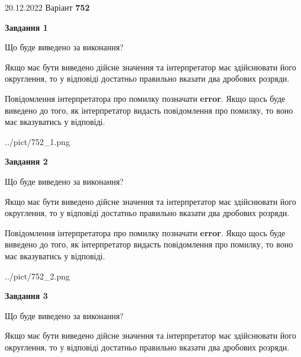 \documentclass[12pt, ukrainian]{article}
\begin{document}
{20.12.2022 Варіант \No \textbf { 752 }\par}
{
\begin {Large}

{\begin {center}\textbf{Завдання 1}\end {center}}\par
Що буде виведено за виконання? \par

Якщо має бути виведено дійсне значення та інтерпретатор має здійснювати його округлення, 
то у відповіді достатньо правильно вказати два дробових розряди.

Повідомлення інтерпретатора про помилку позначати \textbf{error}.
Якщо щось буде виведено до того, як інтерпретатор видасть повідомлення про помилку, 
то воно має вказуватись у відповіді. \par

\begin{center}
	{../pict/752_1.png}
\end{center}
\newpage

{\begin {center}\textbf{Завдання 2}\end {center}}\par
Що буде виведено за виконання? \par

Якщо має бути виведено дійсне значення та інтерпретатор має здійснювати його округлення, 
то у відповіді достатньо правильно вказати два дробових розряди.

Повідомлення інтерпретатора про помилку позначати \textbf{error}.
Якщо щось буде виведено до того, як інтерпретатор видасть повідомлення про помилку, 
то воно має вказуватись у відповіді. \par

\begin{center}
	{../pict/752_2.png}
\end{center}
\newpage

{\begin {center}\textbf{Завдання 3}\end {center}}\par
Що буде виведено за виконання? \par

Якщо має бути виведено дійсне значення та інтерпретатор має здійснювати його округлення, 
то у відповіді достатньо правильно вказати два дробових розряди.


\end{Large}}
\end{document}
